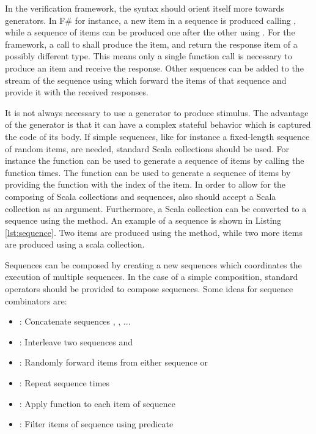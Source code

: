 In the verification framework, the syntax should orient itself more towards generators. In F\# for instance, a new
item in a sequence is produced calling , while a sequence of items can be produced one after the
other using . For the framework, a call to  shall produce the item, and return
the response item of a possibly different type. This means only a single function call is necessary to produce an
item and receive the response.
Other sequences can be added to the stream of the sequence using  which forward the items of that
sequence and provide it with the received responses.

It is not always necessary to use a generator to produce stimulus. The advantage of the generator is that it can have
a complex stateful behavior which is captured the code of its body. If simple sequences, like for instance a
fixed-length sequence of random items, are needed, standard Scala collections should be used. For instance the
 function can be used to generate a sequence of  items by calling the  function
 times. The  function can be used to generate a sequence of  items by
providing the function  with the index of the item. In order to allow for the composing of Scala collections
and sequences,  also should accept a Scala collection as an argument. Furthermore, a Scala collection
can be converted to a sequence using the  method. An example of a sequence is shown in Listing
\ref{lst:sequence}. Two items are produced using the  method, while two more items are produced using a
scala  collection.

Sequences can be composed by creating a new sequences which coordinates the execution of multiple sequences. In the
case of a simple composition, standard operators should be provided to compose sequences. Some ideas for sequence
combinators are:

\begin{itemize}
  \item {}: Concatenate sequences , , ...
  \item {}: Interleave two sequences  and 
  \item {}: Randomly forward items from either sequence  or 
  \item {}: Repeat sequence   times
  \item {}: Apply function  to each item of sequence 
  \item {}: Filter items of sequence  using predicate 
\end{itemize}

